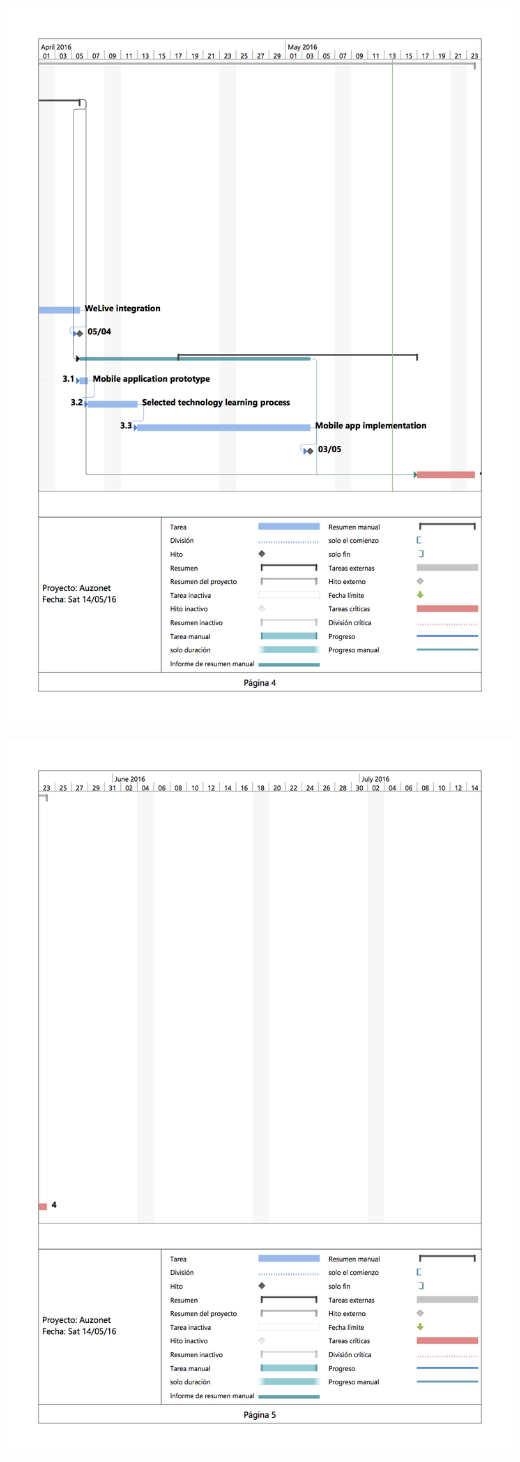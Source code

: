 \documentclass{DeustoFDP}
\begin{document}
\begin{center}
	\includegraphics[width=0.9\linewidth]{fig/g4}
\end{center}
\begin{center}
	\includegraphics[width=0.9\linewidth]{fig/g5}
\end{center}
\newpage
\end{document}
